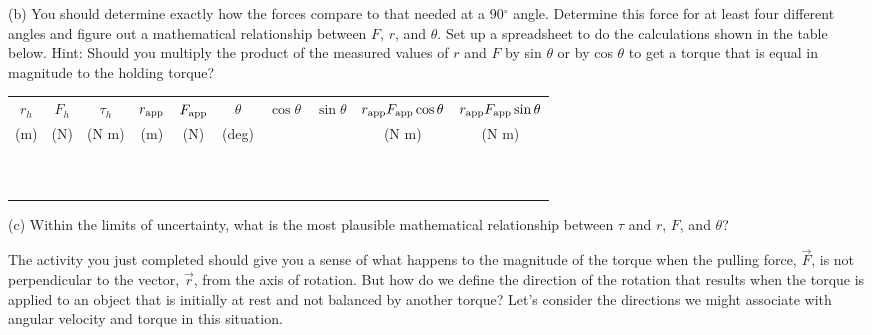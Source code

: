 (b) You should determine exactly how the forces compare to that needed at a
90\( ^{\circ } \) angle. Determine this force for at least four different angles
and figure out a mathematical relationship between $F$, $r$, and \( \theta  \).
Set up a spreadsheet to do the calculations shown in the table below. Hint:
Should you multiply the product of the measured values of $r$ and $F$ 
by sin \( \theta  \)
or by cos \( \theta  \) to get a torque that is equal in magnitude to the holding
torque?

\vspace{0.3cm}
{\centering \begin{tabular}{|c|c|c|c|c|c|c|c|c|c|}
\hline 
\( r_{h} \)&
\( F_{h} \)&
\( \tau _{h} \)&
\( r_{\rm app} \)&
\( F_{\rm app} \)&
\( \theta  \)&
\( \cos \theta  \)&
\( \sin \theta  \)&
\( r_{\rm app} F_{\rm app}\cos \theta  \) &
\(r_{\rm app} F_{\rm app}\sin \theta  \)\\
(m)&
(N)&
(N m)&
(m)&
(N)&
(deg)&
&
&
(N m)&
(N m)\\
\hline 
\hline 
&
&
&
&
&
&
&
&
&
\\
&
&
&
&
&
&
&
&
&
\\
\hline 
&
&
&
&
&
&
&
&
&
\\
&
&
&
&
&
&
&
&
&
\\
\hline 
&
&
&
&
&
&
&
&
&
\\
&
&
&
&
&
&
&
&
&
\\
\hline 
&
&
&
&
&
&
&
&
&
\\
&
&
&
&
&
&
&
&
&
\\
\hline 
&
&
&
&
&
&
&
&
&
\\
&
&
&
&
&
&
&
&
&
\\
\hline 
\end{tabular}\par}
\vspace{0.3cm}

(c) Within the limits of uncertainty, what is the most plausible mathematical
relationship between \( \tau  \) and $r$, $F$, and \( \theta  \)?
\vspace{20mm}

The activity you just completed should give you a sense of what happens to the
magnitude of the torque when the pulling force, \( {\vec  F} \), is
not perpendicular to the vector, \( {\vec  r} \), from the axis of
rotation. But how do we define the direction of the rotation that results when
the torque is applied to an object that is initially at rest and not balanced
by another torque? Let's consider the directions we might associate with angular
velocity and torque in this situation.

